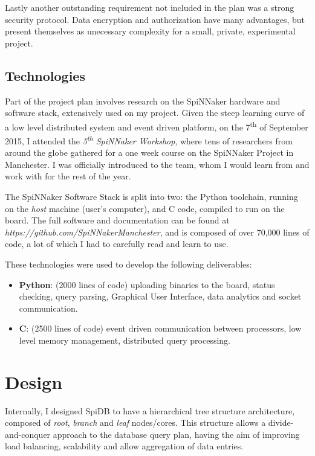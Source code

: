 Lastly another outstanding requirement not included in the plan was a strong security protocol. Data encryption and authorization have many advantages, but present themselves as unecessary complexity for a small, private, experimental project.

\subsection{Technologies}
Part of the project plan involves research on the SpiNNaker hardware and software stack, extensively used on my project. Given the steep learning curve of a low level distributed system and event driven platform, on the 7\textsuperscript{th} of September 2015, I attended the \textit{5\textsuperscript{th} SpiNNaker Workshop}, where tens of researchers from around the globe gathered for a one week course on the SpiNNaker Project in Manchester. I was officially introduced to the team, whom I would learn from and work with for the rest of the year.

The SpiNNaker Software Stack is split into two: the Python toolchain, running on the \textit{host} machine (user's computer), and C code, compiled to run on the board. The full software and documentation can be found at \textit{https://github.com/SpiNNakerManchester}, and is composed of over 70,000 lines of code, a lot of which I had to carefully read and learn to use.

These technologies were used to develop the following deliverables:
\begin{itemize}
	\item \textbf{Python}: (2000 lines of code) uploading binaries to the board, status checking, query parsing, Graphical User Interface, data analytics and socket communication.
	\item \textbf{C}: (2500 lines of code) event driven communication between processors, low level memory management, distributed query processing.
\end{itemize}

\section{Design}
Internally, I designed SpiDB to have a hierarchical tree structure architecture, composed of \textit{root}, \textit{branch} and \textit{leaf} nodes/cores. This structure allows a divide-and-conquer approach to the database query plan, having the aim of improving load balancing, scalability and allow aggregation of data entries.

